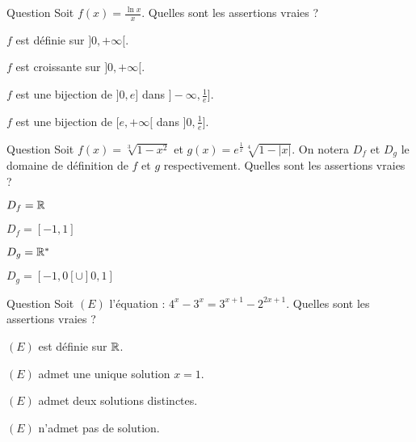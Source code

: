 \begin{multi}[multiple,feedback=
{\(f\) est définie sur \(]0,+\infty[\). En étudiant les variations de \(f\), \(f\) est strictement croissante sur \(]0,e]\) et strictement décroissante sur \([e,+\infty[\). D'autre part, \(f(]0,e])=]-\infty, \frac{1}{e}]\) et \(f([e,+\infty[)=]0, \frac{1}{e}] \). On déduit que \(f\) établit une bijection de \(]0,e]\) dans \(]-\infty, \frac{1}{e}]\) et de \([e,+\infty[\) dans \(]0, \frac{1}{e}]\).
}]{Question}
Soit \(f(x)=\frac{\ln x}{x}\).  Quelles sont les assertions vraies ?

    \item* \(f\) est définie sur \(]0,+\infty[\).
    \item \(f\) est croissante sur \(]0,+\infty[\).
    \item* \(f\) est une bijection de \(]0,e]\) dans \(]-\infty, \frac{1}{e}]\).
    \item* \(f\) est une bijection de \([e,+\infty[\) dans \(]0, \frac{1}{e}]\).
\end{multi}


\begin{multi}[multiple,feedback=
{la fonction \(x\to \sqrt[3]{x}\) est définie sur \(\Rr\), donc \(D_f=\Rr\). La fonction \(x\mapsto \sqrt[4]{x}\) est définie sur \([0,+\infty[\). On déduit que  \(D_g=[-1,0[\cup ]0,1]\).
}]{Question}
Soit \(f(x)= \sqrt[3]{1-x^2}\) et \( g(x)= e^{\frac{1}{x}}\sqrt[4]{1-|x|} \). On notera \(D_f\) et \(D_g\) le domaine de définition de \(f\) et \(g\) respectivement. Quelles sont les assertions vraies ?

    \item* \(D_f=\Rr\)
    \item \(D_f=[-1,1]\)
    \item \(D_g= \mathbb{R}^*\)
    \item* \(D_g=[-1,0[\cup ]0,1]\)
\end{multi}


\begin{multi}[multiple,feedback=
{On a : \((E) \Leftrightarrow 2^{2x}+ 2^{2x+1} = 3^{x+1}+3^x \Leftrightarrow (1+2)2^{2x}=(1+3)3^{x}  \Leftrightarrow 2^{2x-2} =3^{x-1} \Leftrightarrow (2x-2)\ln 2=(x-1) \ln 3 \Leftrightarrow  x=1\).
}]{Question}
Soit \((E)\) l'équation : \( 4^x-3^x=3^{x+1}- 2^{2x+1}\). Quelles sont les assertions vraies ?

    \item* \((E)\) est définie sur \(\Rr\).
    \item* \((E)\) admet une unique solution \(x=1\).
    \item \((E)\) admet deux solutions distinctes.
    \item \((E)\) n'admet pas de solution.
\end{multi}


